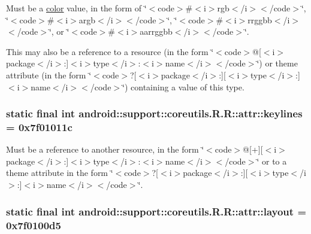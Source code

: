 Must be a \hyperlink{classandroid_1_1support_1_1coreutils_1_1_r_1_1color}{color} value, in the form of \char`\"{}$<$code$>$\#$<$i$>$rgb$<$/i$>$$<$/code$>$\char`\"{}, \char`\"{}$<$code$>$\#$<$i$>$argb$<$/i$>$$<$/code$>$\char`\"{}, \char`\"{}$<$code$>$\#$<$i$>$rrggbb$<$/i$>$$<$/code$>$\char`\"{}, or \char`\"{}$<$code$>$\#$<$i$>$aarrggbb$<$/i$>$$<$/code$>$\char`\"{}. 

This may also be a reference to a resource (in the form \char`\"{}$<$code$>$@\mbox{[}$<$i$>$package$<$/i$>$:\mbox{]}$<$i$>$type$<$/i$>$:$<$i$>$name$<$/i$>$$<$/code$>$\char`\"{}) or theme attribute (in the form \char`\"{}$<$code$>$?\mbox{[}$<$i$>$package$<$/i$>$:\mbox{]}\mbox{[}$<$i$>$type$<$/i$>$:\mbox{]}$<$i$>$name$<$/i$>$$<$/code$>$\char`\"{}) containing a value of this type. \hypertarget{classandroid_1_1support_1_1coreutils_1_1_r_1_1attr_7953a1feda6707414506b7d489f135b6}{
\subsubsection[{keylines}]{\setlength{\rightskip}{0pt plus 5cm}static final int android::support::coreutils.R.R::attr::keylines = 0x7f01011c}}
\label{classandroid_1_1support_1_1coreutils_1_1_r_1_1attr_7953a1feda6707414506b7d489f135b6}


Must be a reference to another resource, in the form \char`\"{}$<$code$>$@\mbox{[}+\mbox{]}\mbox{[}$<$i$>$package$<$/i$>$:\mbox{]}$<$i$>$type$<$/i$>$:$<$i$>$name$<$/i$>$$<$/code$>$\char`\"{} or to a theme attribute in the form \char`\"{}$<$code$>$?\mbox{[}$<$i$>$package$<$/i$>$:\mbox{]}\mbox{[}$<$i$>$type$<$/i$>$:\mbox{]}$<$i$>$name$<$/i$>$$<$/code$>$\char`\"{}. \hypertarget{classandroid_1_1support_1_1coreutils_1_1_r_1_1attr_90332abda34dda49798402cd9446aa6d}{
\subsubsection[{layout}]{\setlength{\rightskip}{0pt plus 5cm}static final int android::support::coreutils.R.R::attr::layout = 0x7f0100d5}}
\label{classandroid_1_1support_1_1coreutils_1_1_r_1_1attr_90332abda34dda49798402cd9446aa6d}


